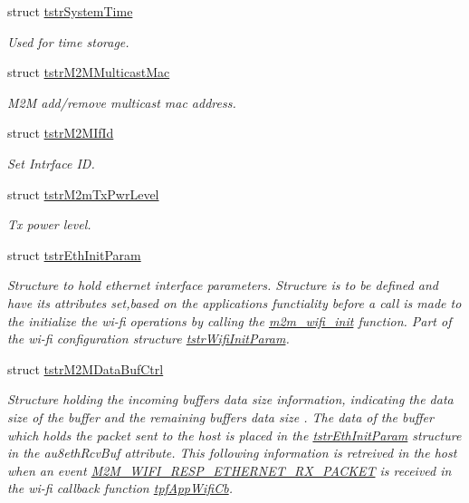 \begin{DoxyCompactItemize}
struct \hyperlink{structtstrSystemTime}{tstr\+System\+Time}
\begin{DoxyCompactList}\small\item\em Used for time storage. \end{DoxyCompactList}\item 
struct \hyperlink{structtstrM2MMulticastMac}{tstr\+M2\+M\+Multicast\+Mac}
\begin{DoxyCompactList}\small\item\em M2M add/remove multicast mac address. \end{DoxyCompactList}\item 
struct \hyperlink{structtstrM2MIfId}{tstr\+M2\+M\+If\+Id}
\begin{DoxyCompactList}\small\item\em Set Intrface ID. \end{DoxyCompactList}\item 
struct \hyperlink{structtstrM2mTxPwrLevel}{tstr\+M2m\+Tx\+Pwr\+Level}
\begin{DoxyCompactList}\small\item\em Tx power level. \end{DoxyCompactList}\item 
struct \hyperlink{structtstrEthInitParam}{tstr\+Eth\+Init\+Param}
\begin{DoxyCompactList}\small\item\em Structure to hold ethernet interface parameters. Structure is to be defined and have its attributes set,based on the application\textquotesingle{}s functiality before a call is made to the initialize the wi-\/fi operations by calling the \hyperlink{group__WifiInitFn_ga73c734812e844d96d860c4e93e9daf35}{m2m\+\_\+wifi\+\_\+init} function. Part of the wi-\/fi configuration structure \hyperlink{structtstrWifiInitParam}{tstr\+Wifi\+Init\+Param}. \end{DoxyCompactList}\item 
struct \hyperlink{structtstrM2MDataBufCtrl}{tstr\+M2\+M\+Data\+Buf\+Ctrl}
\begin{DoxyCompactList}\small\item\em Structure holding the incoming buffer\textquotesingle{}s data size information, indicating the data size of the buffer and the remaining buffer\textquotesingle{}s data size . The data of the buffer which holds the packet sent to the host is placed in the \hyperlink{structtstrEthInitParam}{tstr\+Eth\+Init\+Param} structure in the au8eth\+Rcv\+Buf attribute. This following information is retreived in the host when an event \hyperlink{group__WlanEnums_gga064de09dec1d5e88ed8d075fa40f57dea2d2336ccd8bfda6e083b0ec6b8d798ba}{M2\+M\+\_\+\+W\+I\+F\+I\+\_\+\+R\+E\+S\+P\+\_\+\+E\+T\+H\+E\+R\+N\+E\+T\+\_\+\+R\+X\+\_\+\+P\+A\+C\+K\+ET} is received in the wi-\/fi callback function \hyperlink{group__WlanEnums_gac5302f32839285fe8375c159087aa8a1}{tpf\+App\+Wifi\+Cb}. \end{DoxyCompactList}\item 

\end{DoxyCompactItemize}
